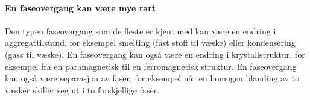 \paragraph{En faseovergang kan være mye rart} Den typen faseovergang som de fleste er kjent med kan være en endring i aggregattilstand, for eksempel smelting (fast stoff til væske) eller kondensering (gass til væske). En faseovergang kan også være en endring i krystallstruktur, for eksempel fra en paramagnetisk til en ferromagnetisk struktur. En faseovergang kan også være separasjon av faser, for eksempel når en homogen blanding av to væsker skiller seg ut i to forskjellige faser.



